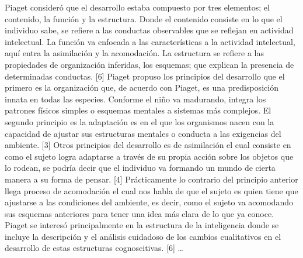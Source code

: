 \documentclass{bmcart}
\begin{document}
\newline
\newline
Piaget consideró que el desarrollo estaba compuesto por tres elementos; el contenido, la función y la estructura. Donde el contenido consiste en lo que el individuo sabe, se refiere a las conductas observables que se reflejan en actividad intelectual. La función va enfocada a las características a la actividad intelectual, aquí entra la asimilación y la acomodación. La estructura se refiere a las propiedades de organización inferidas, los esquemas; que explican la presencia de determinadas conductas. [6]
\newline
\newline
Piaget propuso los principios del desarrollo que el  primero  es  la  organización  que,  de  acuerdo  con Piaget,  es  una  predisposición  innata  en  todas  las  especies.  Conforme  el  niño  va madurando, integra los patrones físicos simples o esquemas mentales a sistemas más complejos.  El  segundo  principio  es  la  adaptación es en el que los  organismos nacen  con  la  capacidad  de  ajustar  sus  estructuras  mentales  o  conducta  a  las exigencias del ambiente. [3]
\newline
\newline
Otros principios del desarrollo es de asimilación el cual consiste en como el sujeto logra adaptarse a través de su propia acción sobre los objetos que lo rodean, se podría decir que el individuo va formando un mundo de cierta manera a su forma de pensar. [4] Prácticamente lo contrario del principio anterior llega proceso de acomodación el cual nos habla de que el sujeto es quien tiene que ajustarse a las condiciones del ambiente, es decir, como el sujeto va acomodando sus esquemas anteriores para tener una idea más clara de lo que ya conoce.
\newline
\newline
Piaget se interesó principalmente en la estructura de la inteligencia donde se incluye la descripción y el análisis cuidadoso de los cambios cualitativos en el desarrollo de estas estructuras cognoscitivas. [6]
 \ldots
\end{document}
